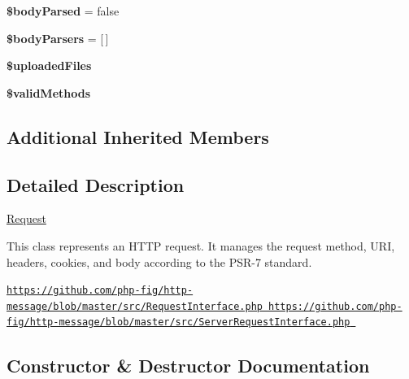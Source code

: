 \begin{DoxyCompactItemize}
\mbox{\label{class_pes_1_1_http_1_1_request_acafb476e2c1ae064806866cb8e8be20f}} 
{\bfseries \$body\+Parsed} = false
\item 
\mbox{\label{class_pes_1_1_http_1_1_request_a4743f9d986debd632acb75b012a7e293}} 
{\bfseries \$body\+Parsers} = \mbox{[}$\,$\mbox{]}
\item 
\mbox{\label{class_pes_1_1_http_1_1_request_a4278c5b4416595b5dd125eada16c4324}} 
{\bfseries \$uploaded\+Files}
\item 
{\bfseries \$valid\+Methods}
\end{DoxyCompactItemize}
\subsection*{Additional Inherited Members}


\subsection{Detailed Description}
\mbox{\hyperlink{class_pes_1_1_http_1_1_request}{Request}}

This class represents an H\+T\+TP request. It manages the request method, U\+RI, headers, cookies, and body according to the P\+S\+R-\/7 standard.

\mbox{\hyperlink{}{\href{https://github.com/php-fig/http-message/blob/master/src/RequestInterface.php}{\tt https\+://github.\+com/php-\/fig/http-\/message/blob/master/src/\+Request\+Interface.\+php}  \href{https://github.com/php-fig/http-message/blob/master/src/ServerRequestInterface.php}{\tt https\+://github.\+com/php-\/fig/http-\/message/blob/master/src/\+Server\+Request\+Interface.\+php} }}

\subsection{Constructor \& Destructor Documentation}
\mbox{\label{class_pes_1_1_http_1_1_request_a47593cf6b1ffe99d8d3d36d5a92685ba}} 
